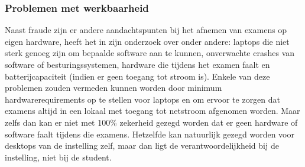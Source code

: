 \subsubsection{Problemen met werkbaarheid}
Naast fraude zijn er andere aandachtspunten bij het afnemen van examens op eigen hardware, \textcite{Hillier2015} heeft het in zijn onderzoek over onder andere: laptops die niet sterk genoeg zijn om bepaalde software aan te kunnen, onverwachte crashes van software of besturingssystemen, hardware die tijdens het examen faalt en batterijcapaciteit (indien er geen toegang tot stroom is). Enkele van deze problemen zouden vermeden kunnen worden door minimum hardwarerequirements op te stellen voor laptops en om ervoor te zorgen dat examens altijd in een lokaal met toegang tot netstroom afgenomen worden. Maar zelfs dan kan er niet met 100\% zekerheid gezegd worden dat er geen hardware of software faalt tijdens die examens. Hetzelfde kan natuurlijk gezegd worden voor desktops van de instelling zelf, maar dan ligt de verantwoordelijkheid bij de instelling, niet bij de student. 


    






